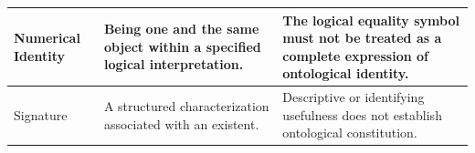 \begin{center}
\begin{longtable}{
    >{\raggedright\arraybackslash}p{}
    >{\raggedright\arraybackslash}p{}
    >{\raggedright\arraybackslash}p{}
}
Numerical Identity &
Being one and the same object within a specified logical interpretation. &
The logical equality symbol must not be treated as a complete expression of ontological identity.
\\ \hline

Signature &
A structured characterization associated with an existent. &
Descriptive or identifying usefulness does not establish ontological constitution.
\\ \hline

\end{longtable}
\end{center}

